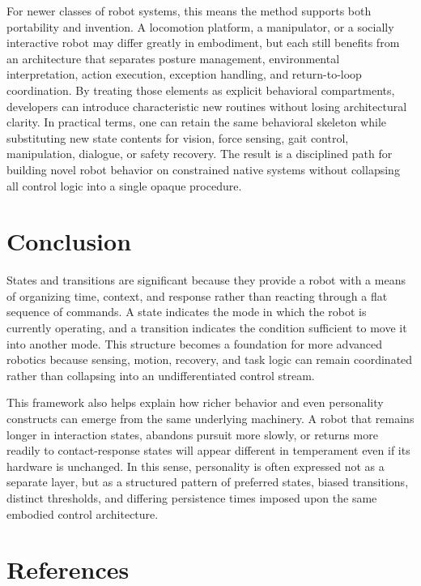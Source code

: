 \documentclass[11pt]{article}
\begin{document}
For newer classes of robot systems, this means the method supports both
portability and invention. A locomotion platform, a manipulator, or a
socially interactive robot may differ greatly in embodiment, but each
still benefits from an architecture that separates posture management,
environmental interpretation, action execution, exception handling, and
return-to-loop coordination. By treating those elements as explicit
behavioral compartments, developers can introduce characteristic new
routines without losing architectural clarity. In practical terms, one
can retain the same behavioral skeleton while substituting new state
contents for vision, force sensing, gait control, manipulation,
dialogue, or safety recovery. The result is a disciplined path for
building novel robot behavior on constrained native systems without
collapsing all control logic into a single opaque procedure.

\section*{Conclusion}

States and transitions are significant because they provide a robot
with a means of organizing time, context, and response rather than
reacting through a flat sequence of commands. A state indicates the
mode in which the robot is currently operating, and a transition
indicates the condition sufficient to move it into another mode. This
structure becomes a foundation for more advanced robotics because
sensing, motion, recovery, and task logic can remain coordinated rather
than collapsing into an undifferentiated control stream.

This framework also helps explain how richer behavior and even
personality constructs can emerge from the same underlying machinery. A
robot that remains longer in interaction states, abandons pursuit more
slowly, or returns more readily to contact-response states will appear
different in temperament even if its hardware is unchanged. In this
sense, personality is often expressed not as a separate layer, but as a
structured pattern of preferred states, biased transitions, distinct
thresholds, and differing persistence times imposed upon the same
embodied control architecture.

\section*{References}
\end{document}
